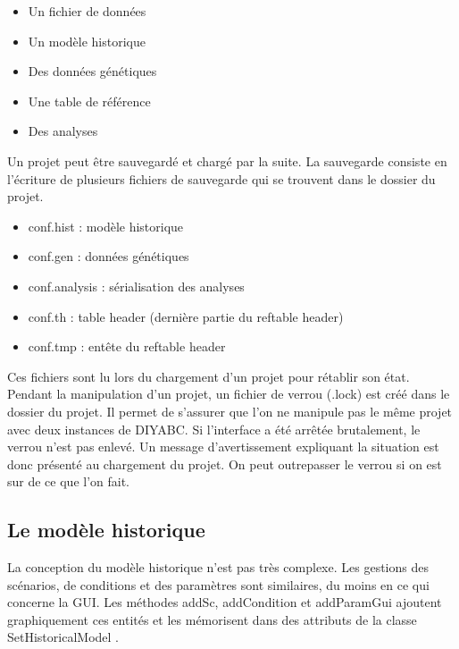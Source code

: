 \documentclass[12pt,a4paper]{article}
\begin{document}
        \begin{itemize}
            \item Un fichier de données
            \item Un modèle historique
            \item Des données génétiques
            \item Une table de référence
            \item Des analyses\\
        \end{itemize}

        Un projet peut être sauvegardé et chargé par la suite. La sauvegarde
        consiste en l'écriture de plusieurs fichiers de sauvegarde qui se
        trouvent dans le dossier du projet.\\

        \begin{itemize}
            \item conf.hist : modèle historique
            \item conf.gen : données génétiques
            \item conf.analysis : sérialisation des analyses
            \item conf.th : table header (dernière partie du reftable header)
            \item conf.tmp : entête du reftable header\\
        \end{itemize}

        Ces fichiers sont lu lors du chargement d'un projet pour rétablir son
        état. Pendant la manipulation d'un projet, un fichier de verrou (.lock)
        est créé dans le dossier du projet. Il permet de s'assurer que l'on ne
        manipule pas le même projet avec deux instances de DIYABC. Si
        l'interface a été arrêtée brutalement, le verrou n'est pas enlevé. Un
        message d'avertissement expliquant la situation est donc présenté au
        chargement du projet. On peut outrepasser le verrou si on est sur de ce
        que l'on fait.

    \subsection{Le modèle historique}
        La conception du modèle historique n'est pas très complexe. Les gestions
        des scénarios, de conditions et des paramètres sont similaires, du moins
        en ce qui concerne la GUI. Les méthodes addSc, addCondition et
        addParamGui ajoutent graphiquement ces entités et les mémorisent dans
        des attributs de la classe SetHistoricalModel .
\end{document}
